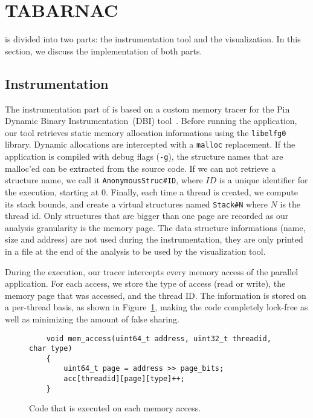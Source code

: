 
\section{TABARNAC}
\label{sec:design}

\TABARNAC is divided into two parts: the instrumentation tool and the
visualization.  In this section, we discuss the implementation of both parts.

\subsection{Instrumentation}
\label{sec:design-impl}

The instrumentation part of \TABARNAC is based on a custom memory tracer for the Pin Dynamic Binary Instrumentation~(DBI) tool~\cite{Luk05Pin}.
Before running the application, our tool retrieves static memory allocation
informations using the \texttt{libelfg0} library. Dynamic allocations are
intercepted with a \texttt{malloc} replacement. If the application is
compiled with debug flags (\texttt{-g}), the structure names that are malloc'ed can be extracted from the source
code. If we can not retrieve a structure name, we call it
\texttt{AnonymousStruc\#ID}, where $ID$ is a unique identifier for the
execution, starting at $0$. Finally, each time a thread is created, we compute
its stack bounds, and create a virtual structures named \texttt{Stack\#N} where
$N$ is the thread id. Only structures that are bigger than one page are recorded as our
analysis granularity is the memory page. The data structure informations (name,
size and address) are not used during the instrumentation, they are only
printed in a file at the end of the analysis to be used by the visualization
tool.

During the execution, our tracer intercepts every memory access of the parallel application.
For each access, we store the type of access (read or write), the memory page that was accessed, and the thread ID.
The information is stored on a per-thread basis, as shown in Figure~\ref{fig:code}, making the code completely lock-free as well as minimizing the amount of false sharing.

\begin{figure}[!h]
\begin{lstlisting}
	void mem_access(uint64_t address, uint32_t threadid, char type)
	{
		uint64_t page = address >> page_bits;
		acc[threadid][page][type]++;
	}

\end{lstlisting}
\caption{Code that is executed on each memory access.}
\label{fig:code}
\end{figure}


